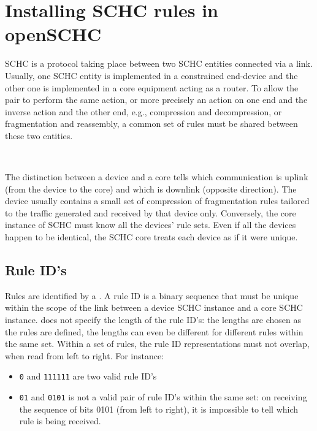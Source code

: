 
\chapter{Installing SCHC rules in openSCHC}\label{chap-rules}

SCHC is a protocol taking place between two SCHC entities connected via a link. Usually, one SCHC entity is implemented in a constrained end-device and the other one is implemented in a core equipment acting as a router. To allow the pair to perform the same action, or more precisely an action on one end and the inverse action and the other end, e.g., compression and decompression, or fragmentation and reassembly, a common set of rules must be shared between these two entities.

~

The distinction between a device and a core tells which communication is uplink (from the device to the core) and which is downlink (opposite direction). The device usually contains a small set of compression of fragmentation rules tailored to the traffic generated and received by that device only. Conversely, the core instance of SCHC must know all the devices' rule sets. Even if all the devices happen to be identical, the SCHC core treats each device as if it were unique. 

\section{Rule ID's}

Rules are identified by a . A rule ID is a binary sequence that must be unique within the scope of the link between a device SCHC instance and a core SCHC instance.  does not specify the length of the rule ID's: the lengths are chosen as the rules are defined, the lengths can even be different for different rules within the same set. Within a set of rules, the rule ID representations must not overlap, when read from left to right. 
For instance:

\begin{itemize}
\item\texttt{0} and \texttt{111111} are two valid rule ID's
\item \texttt{01} and \texttt{0101} is not a valid pair of rule ID's within the same set: on receiving the sequence of bits 0101 (from left to right), it is impossible to tell which rule is being received.
\end{itemize}

~


